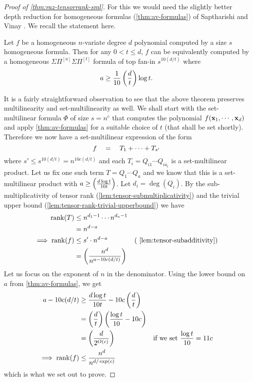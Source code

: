 \begin{proof}[Proof of \autoref{thm:raz-tensorrank-sml}]



For this we would need the slightly better depth reduction for homogeneous formulas (\autoref{thm:av-formulas}) of Saptharishi and Vinay \cite{saptharishivinay14}. We recall the statement here.
\begin{theorem*}
Let $f$ be a homogeneous $n$-variate degree $d$ polynomial computed by a size $s$ homogeneous formula. 
Then for any $0< t \leq d$, $f$ can be equivalently computed by a homogeneous $\Sigma\Pi^{[a]}\Sigma\Pi^{[t]}$ formula of top fan-in $s^{10(d/t)}$ where 
\[
a \geq \frac{1}{10}\left(\frac{d}{t}\right) \log t.
\]
\end{theorem*}
It is a fairly straightforward observation to see that the above theorem preserves multilinearity and set-multilinearity as well. We shall start with the set-multilinear formula $\Phi$ of size $s = n^c$ that computes the polynomial $f(\mathbf{x}_1,\cdots, \mathbf{x}_d)$ and apply \autoref{thm:av-formulas} for a suitable choice of $t$ (that shall be set shortly). 
Therefore we now have a set-multilinear expression of the form
\[
f \quad = \quad T_1 + \cdots + T_{s'}
\]
where $s' \leq s^{10(d/t)} = n^{10c(d/t)}$ and each $T_i = Q_{i1} \cdots Q_{ia_i}$ is a set-multilinear product. Let us fix one such term $T = Q_{1} \cdots Q_a$ and we know that this is a set-multilinear product with $a \geq \left(\frac{d\log t}{10 t}\right)$. Let $d_i = \deg(Q_i)$. By the sub-multiplicativity of tensor rank (\autoref{lem:tensor-submultiplicativity}) and the trivial upper bound (\autoref{lem:tensor-rank-trivial-upperbound}) we have
\begin{align*}
\rank(T) & \leq n^{d_1 - 1} \cdots n^{d_a - 1}\\
 & =  n^{d - a}\\
\implies \rank(f) & \leq s' \cdot n^{d-a} & \text{(~\autoref{lem:tensor-subadditivity})}\\
 & =  \pfrac{n^d}{n^{a - 10c(d/t)}}
\end{align*}
Let us focus on the exponent of $n$ in the denominator. Using the lower bound on $a$ from \autoref{thm:av-formulas}, we get
\begin{align*}
a - 10c(d/t) & \geq \frac{d\log t}{10t} - 10c\left(\frac{d}{t}\right)\\
& = \left(\frac{d}{t}\right) \left(\frac{\log t}{10} - 10c\right)\\
& = \left(\frac{d}{2^{O(c)}}\right)& \text{if we set $\frac{\log t}{10} = 11c$}\\
\implies \operatorname{rank}(f) & \leq \frac{n^d}{n^{d/\exp(c)}}
\end{align*}
which is what we set out to prove. 
\end{proof}

